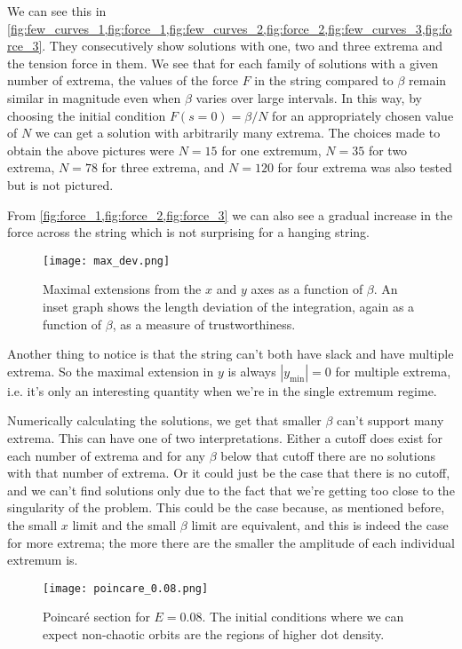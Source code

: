 \documentclass[10pt,a4paper,twocolumn]{article}
\begin{document}
We can see this in \cref{fig:few_curves_1,fig:force_1,fig:few_curves_2,fig:force_2,fig:few_curves_3,fig:force_3}. They consecutively show solutions with one, two and three extrema and the tension force in them. We see that for each family of solutions with a given number of extrema, the values of the force $F$ in the string compared to $\beta$ remain similar in magnitude even when $\beta$ varies over large intervals. In this way, by choosing the initial condition $F(s=0) = \beta/N$ for an appropriately chosen value of $N$ we can get a solution with arbitrarily many extrema. The choices made to obtain the above pictures were $N = 15$ for one extremum, $N = 35$ for two extrema, $N = 78$ for three extrema, and $N = 120$ for four extrema was also tested but is not pictured.

From \cref{fig:force_1,fig:force_2,fig:force_3} we can also see a gradual increase in the force across the string which is not surprising for a hanging string.

\begin{figure}[h]
    \centering
    \texttt{[image: max\_dev.png]}
    \caption{Maximal extensions from the $x$ and $y$ axes as a function of $\beta$. An inset graph shows the length deviation of the integration, again as a function of $\beta$, as a measure of trustworthiness.}
    \label{fig:max_dev}
\end{figure}

Another thing to notice is that the string can't both have slack and have multiple extrema. So the maximal extension in $y$ is always $|y_{\mathrm{\min}}| = 0$ for multiple extrema, i.e. it's only an interesting quantity when we're in the single extremum regime.

Numerically calculating the solutions, we get that smaller $\beta$ can't support many extrema. This can have one of two interpretations. Either a cutoff does exist for each number of extrema and for any $\beta$ below that cutoff there are no solutions with that number of extrema. Or it could just be the case that there is no cutoff, and we can't find solutions only due to the fact that we're getting too close to the singularity of the problem. This could be the case because, as mentioned before, the small $x$ limit and the small $\beta$ limit are equivalent, and this is indeed the case for more extrema; the more there are the smaller the amplitude of each individual extremum is.

\begin{figure}[h]
    \centering
    \texttt{[image: poincare\_0.08.png]}
    \caption{Poincar\'e section for $E=0.08$. The initial conditions where we can expect non-chaotic orbits are the regions of higher dot density.}
    \label{fig:poincare_1}
\end{figure}
\end{document}
